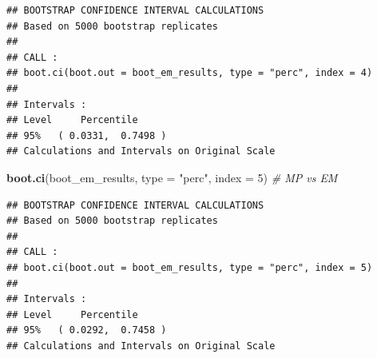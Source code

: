 \documentclass[
]{article}
\newenvironment{Shaded}{\begin{snugshade}}{\end{snugshade}}
\newcommand{\AttributeTok}[1]{\textcolor[rgb]{0.13,0.29,0.53}{#1}}
\newcommand{\CommentTok}[1]{\textcolor[rgb]{0.56,0.35,0.01}{\textit{#1}}}
\newcommand{\DecValTok}[1]{\textcolor[rgb]{0.00,0.00,0.81}{#1}}
\newcommand{\FunctionTok}[1]{\textcolor[rgb]{0.13,0.29,0.53}{\textbf{#1}}}
\newcommand{\NormalTok}[1]{#1}
\newcommand{\StringTok}[1]{\textcolor[rgb]{0.31,0.60,0.02}{#1}}
\begin{document}
\begin{verbatim}
## BOOTSTRAP CONFIDENCE INTERVAL CALCULATIONS
## Based on 5000 bootstrap replicates
## 
## CALL : 
## boot.ci(boot.out = boot_em_results, type = "perc", index = 4)
## 
## Intervals : 
## Level     Percentile     
## 95%   ( 0.0331,  0.7498 )  
## Calculations and Intervals on Original Scale
\end{verbatim}

\begin{Shaded}
\begin{Highlighting}[]
\FunctionTok{boot.ci}\NormalTok{(boot\_em\_results, }\AttributeTok{type =} \StringTok{"perc"}\NormalTok{, }\AttributeTok{index =} \DecValTok{5}\NormalTok{) }\CommentTok{\# MP vs EM}
\end{Highlighting}
\end{Shaded}

\begin{verbatim}
## BOOTSTRAP CONFIDENCE INTERVAL CALCULATIONS
## Based on 5000 bootstrap replicates
## 
## CALL : 
## boot.ci(boot.out = boot_em_results, type = "perc", index = 5)
## 
## Intervals : 
## Level     Percentile     
## 95%   ( 0.0292,  0.7458 )  
## Calculations and Intervals on Original Scale
\end{verbatim}
\end{document}
